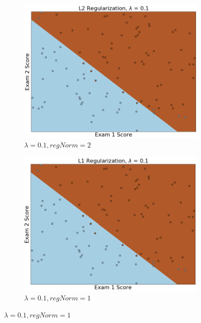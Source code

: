 \documentclass{article}
\begin{document}
\begin{enumerate}
    	\begin{figure}[h!]
     	\centering
     	\begin{subfigure}[b]{0.44\textwidth}
         	\centering
         	\includegraphics[width=\textwidth]
         	{Problem_1_3/fig_L2_3.png}
         	\caption{$\lambda = 0.1, regNorm = 2$}
         	\label{fig:L2_3}
     	\end{subfigure}
     	\hfill
     	\begin{subfigure}[b]{0.44\textwidth}
         	\centering
         	\includegraphics[width=\textwidth]
         	{Problem_1_3/fig_L1_3.png}
         	\caption{$\lambda = 0.1, regNorm = 1$}
         	\label{fig:L1_3}
     	\end{subfigure}
		\end{figure}
		

\end{enumerate}
\end{document}
